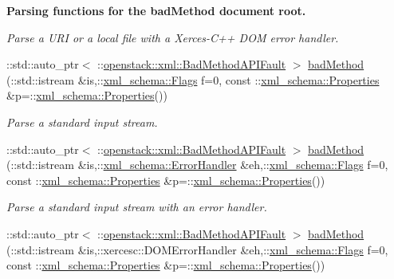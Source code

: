 \begin{Indent}{\bf Parsing functions for the badMethod document root.}
\begin{DoxyCompactItemize}
\begin{DoxyCompactList}\small\item\em Parse a URI or a local file with a Xerces-\/C++ DOM error handler. \item\end{DoxyCompactList}\item 
::std::auto\_\-ptr$<$ ::\hyperlink{classopenstack_1_1xml_1_1BadMethodAPIFault}{openstack::xml::BadMethodAPIFault} $>$ \hyperlink{namespaceopenstack_1_1xml_a3a412b29aa825511bd72e52ab233df72}{badMethod} (::std::istream \&is,::\hyperlink{namespacexml__schema_affb4c227cbd9aa7453dd1dc5a1401943}{xml\_\-schema::Flags} f=0, const ::\hyperlink{namespacexml__schema_ad27ce19a7ee1d3b1064092648898f64c}{xml\_\-schema::Properties} \&p=::\hyperlink{namespacexml__schema_ad27ce19a7ee1d3b1064092648898f64c}{xml\_\-schema::Properties}())
\begin{DoxyCompactList}\small\item\em Parse a standard input stream. \item\end{DoxyCompactList}\item 
::std::auto\_\-ptr$<$ ::\hyperlink{classopenstack_1_1xml_1_1BadMethodAPIFault}{openstack::xml::BadMethodAPIFault} $>$ \hyperlink{namespaceopenstack_1_1xml_ace7f7a02fdb702f4329758a532f208cf}{badMethod} (::std::istream \&is,::\hyperlink{namespacexml__schema_ab1c9361bfd3b404eaabf0c31eded79dc}{xml\_\-schema::ErrorHandler} \&eh,::\hyperlink{namespacexml__schema_affb4c227cbd9aa7453dd1dc5a1401943}{xml\_\-schema::Flags} f=0, const ::\hyperlink{namespacexml__schema_ad27ce19a7ee1d3b1064092648898f64c}{xml\_\-schema::Properties} \&p=::\hyperlink{namespacexml__schema_ad27ce19a7ee1d3b1064092648898f64c}{xml\_\-schema::Properties}())
\begin{DoxyCompactList}\small\item\em Parse a standard input stream with an error handler. \item\end{DoxyCompactList}\item 
::std::auto\_\-ptr$<$ ::\hyperlink{classopenstack_1_1xml_1_1BadMethodAPIFault}{openstack::xml::BadMethodAPIFault} $>$ \hyperlink{namespaceopenstack_1_1xml_ada298c27ac894b17cdcf4ce6e5280812}{badMethod} (::std::istream \&is,::xercesc::DOMErrorHandler \&eh,::\hyperlink{namespacexml__schema_affb4c227cbd9aa7453dd1dc5a1401943}{xml\_\-schema::Flags} f=0, const ::\hyperlink{namespacexml__schema_ad27ce19a7ee1d3b1064092648898f64c}{xml\_\-schema::Properties} \&p=::\hyperlink{namespacexml__schema_ad27ce19a7ee1d3b1064092648898f64c}{xml\_\-schema::Properties}())

\end{DoxyCompactItemize}
\end{Indent}
